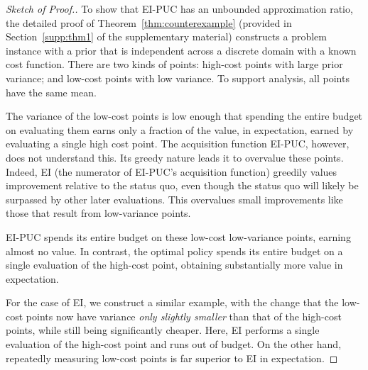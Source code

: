 \vspace{-10pt}
\begin{proof}[Sketch of Proof.]  To show that EI-PUC has an unbounded approximation ratio, the detailed proof of Theorem~\ref{thm:counterexample} (provided in Section~\ref{supp:thm1} of the supplementary material) constructs a problem instance with a prior that is independent across a discrete domain with a known cost function. There are two kinds of points: high-cost points with large prior variance; and low-cost points with low variance. To support analysis, all points have the same mean.

The variance of the low-cost points is low enough that spending the entire budget on evaluating them earns only a fraction of the value, in expectation, earned by evaluating a single high cost point. The acquisition function EI-PUC, however, does not understand this. Its greedy nature leads it to overvalue these points. 
Indeed, EI (the numerator of EI-PUC's acquisition function) greedily values improvement relative to the status quo, even though the status quo will likely be surpassed by other later evaluations. This overvalues small improvements like those that result from low-variance points.

EI-PUC spends its entire budget on these low-cost low-variance points, earning almost no value. In contrast, the optimal policy spends its entire budget on a single evaluation of the high-cost point, obtaining substantially more value in expectation. 


For the case of EI, we construct a similar example, with the change that the low-cost points now have variance \emph{only slightly smaller} than that of the high-cost points, while still being significantly cheaper. Here, EI performs a single evaluation of the high-cost point and runs out of budget. 
On the other hand, repeatedly measuring low-cost points is far superior to EI in expectation.
\end{proof}
\vspace{-5pt}

